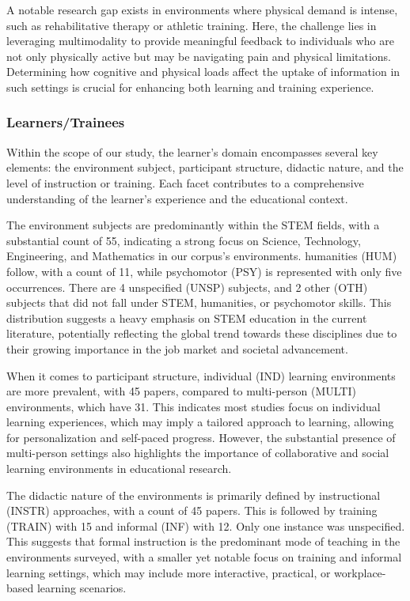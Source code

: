 \documentclass[manuscript,screen,review]{acmart}
\begin{document}
A notable research gap exists in environments where physical demand is intense, such as rehabilitative therapy or athletic training. Here, the challenge lies in leveraging multimodality to provide meaningful feedback to individuals who are not only physically active but may be navigating pain and physical limitations. Determining how cognitive and physical loads affect the uptake of information in such settings is crucial for enhancing both learning and training experience.

\subsubsection{Learners/Trainees}
Within the scope of our study, the learner's domain encompasses several key elements: the environment subject, participant structure, didactic nature, and the level of instruction or training. Each facet contributes to a comprehensive understanding of the learner's experience and the educational context.

The environment subjects are predominantly within the STEM fields, with a substantial count of 55, indicating a strong focus on Science, Technology, Engineering, and Mathematics in our corpus's environments. humanities (HUM) follow, with a count of 11, while psychomotor (PSY) is represented with only five occurrences. There are 4 unspecified (UNSP) subjects, and 2 other (OTH) subjects that did not fall under STEM, humanities, or psychomotor skills. This distribution suggests a heavy emphasis on STEM education in the current literature, potentially reflecting the global trend towards these disciplines due to their growing importance in the job market and societal advancement.

When it comes to participant structure, individual (IND) learning environments are more prevalent, with 45 papers, compared to multi-person (MULTI) environments, which have 31. This indicates most studies focus on individual learning experiences, which may imply a tailored approach to learning, allowing for personalization and self-paced progress. However, the substantial presence of multi-person settings also highlights the importance of collaborative and social learning environments in educational research.

The didactic nature of the environments is primarily defined by instructional (INSTR) approaches, with a count of 45 papers. This is followed by training (TRAIN) with 15 and informal (INF) with 12. Only one instance was unspecified. This suggests that formal instruction is the predominant mode of teaching in the environments surveyed, with a smaller yet notable focus on training and informal learning settings, which may include more interactive, practical, or workplace-based learning scenarios.
\end{document}
